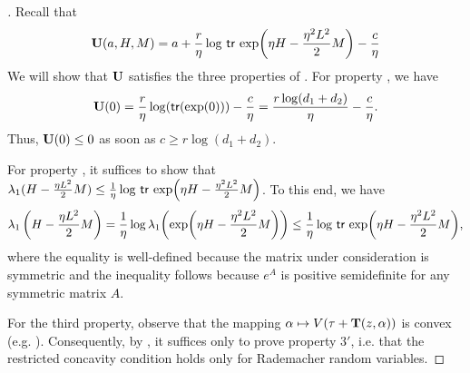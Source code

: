   \begin{proof}[]

    Recall that
    \[
      \burk(a, H, M) = a+ \frac{r}{\eta}\log\,\Tr\,\exp\prn*{\eta{}H - \frac{\eta^{2}L^{2}}{2}M} - \frac{c}{\eta}
    \]
We will show that $\mathbf{U}$ satisfies the three properties of . For property \propone{}, we have
\[
\burk(0) = \frac{r}{\eta}\log\prn*{\Tr\prn*{\exp\prn*{0}}} - \frac{c}{\eta} = \frac{r\log(d_1 + d_2)}{\eta} - \frac{c}{\eta}.
\]
Thus, $\mathbf{U}(0)\leq{}0$ as soon as $c\geq{}r\log(d_1+d_2)$.

For property \proptwo{}, it suffices to show that $\lambda_{1}(H-\frac{\eta{}L^{2}}{2}M) \leq{} \frac{1}{\eta}\log\,\Tr\,\exp\prn*{\eta{}H - \frac{\eta^{2}L^{2}}{2}M}$. To this end, we have
\begin{align*}
  \lambda_{1}\left(H-\frac{\eta{}L^{2}}{2}M \right)  =   \frac{1}{\eta}\log \lambda_{1}\prn*{\exp\prn*{\eta{}H-\frac{\eta^2L^{2}}{2}M}} \leq{} \frac{1}{\eta}\log\,\Tr\,\exp\prn*{\eta{}H-\frac{\eta^2L^{2}}{2}M
  },
\end{align*}
where the equality is well-defined because the matrix under consideration is symmetric and the inequality follows because $e^{A}$ is positive semidefinite for any symmetric matrix $A$.

For the third property, observe that the mapping $\alpha\mapsto{}V(\tau + \mathbf{T}(z,\alpha))$ is convex (e.g. \citep{lewis1996convex}). Consequently, by , it suffices only to prove property $3'$, i.e. that the restricted concavity condition holds only for Rademacher random variables.


\end{proof}
